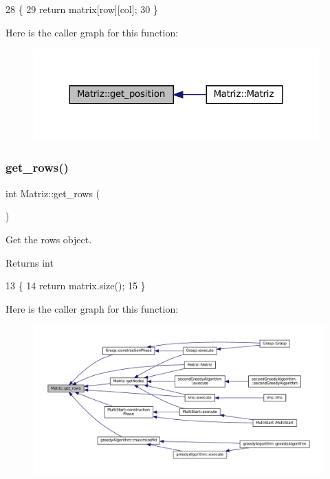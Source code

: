 \begin{DoxyCode}
28 \{
29   \textcolor{keywordflow}{return} matrix[row][col];
30 \}
\end{DoxyCode}
Here is the caller graph for this function\+:
\nopagebreak
\begin{figure}[H]
\begin{center}
\leavevmode
\includegraphics[width=312pt]{classMatriz_a1894d8447d3ae6992a43e46f93422b88_icgraph}
\end{center}
\end{figure}
\mbox{\label{classMatriz_a6b18342f8c083baece693ff41185a206}} 
\subsubsection{\texorpdfstring{get\+\_\+rows()}{get\_rows()}}
{\footnotesize\ttfamily int Matriz\+::get\+\_\+rows (\begin{DoxyParamCaption}{ }\end{DoxyParamCaption})}



Get the rows object. 

\begin{DoxyReturn}{Returns}
int 
\end{DoxyReturn}

\begin{DoxyCode}
13 \{
14   \textcolor{keywordflow}{return} matrix.size();
15 \}
\end{DoxyCode}
Here is the caller graph for this function\+:
\nopagebreak
\begin{figure}[H]
\begin{center}
\leavevmode
\includegraphics[width=350pt]{classMatriz_a6b18342f8c083baece693ff41185a206_icgraph}
\end{center}
\end{figure}
\mbox{\label{classMatriz_a8df14a27d791f24206dd633b2a685c5b}} 
